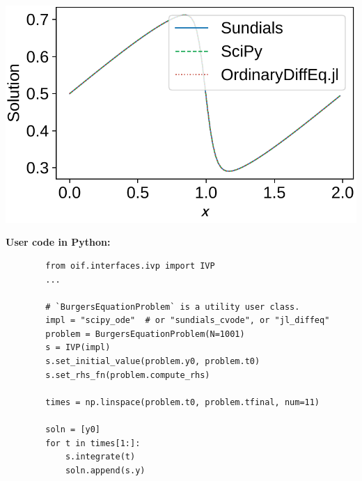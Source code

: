 \documentclass[a0paper, twocolumn, csc, english, final]{mpi2015_poster}
\begin{document}
\begin{poster}
\begin{pcolumn}
\begin{pbox}
\begin{minipage}{\dimexpr0.58\columnwidth - 2\tabcolsep}
        \vspace{0.5em}
      \end{minipage}\hfill%
      \begin{minipage}{\dimexpr0.42\columnwidth - 2\tabcolsep}
        \includegraphics{ivp_c_burgers_eq}
      \end{minipage}

      \vspace{0.5em}
      \textbf{User code in Python:}
      \begin{verbatim}
        from oif.interfaces.ivp import IVP
        ...

        # `BurgersEquationProblem` is a utility user class.
        impl = "scipy_ode"  # or "sundials_cvode", or "jl_diffeq"
        problem = BurgersEquationProblem(N=1001)
        s = IVP(impl)
        s.set_initial_value(problem.y0, problem.t0)
        s.set_rhs_fn(problem.compute_rhs)

        times = np.linspace(problem.t0, problem.tfinal, num=11)

        soln = [y0]
        for t in times[1:]:
            s.integrate(t)
            soln.append(s.y)
      \end{verbatim}
    \end{pbox}
    \begin{pbox}


\end{pbox}
\end{pcolumn}
\end{poster}
\end{document}
